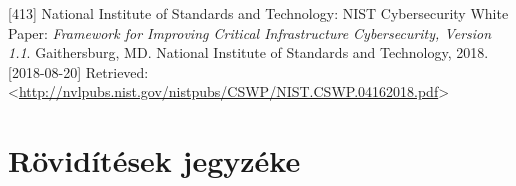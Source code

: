 \documentclass[12pt,magyar,a4paper,oneside]{scrreprt}
\begin{document}
\leavevmode\hypertarget{ref-national_institute_of_standards_and_technology_framework_2018}{}%
{[}413{]} National Institute of Standards and Technology: NIST
Cybersecurity White Paper: \emph{Framework for Improving Critical
Infrastructure Cybersecurity, Version 1.1}. Gaithersburg, MD. National
Institute of Standards and Technology, 2018. {[}2018-08-20{]} Retrieved:
\textless{}\url{http://nvlpubs.nist.gov/nistpubs/CSWP/NIST.CSWP.04162018.pdf}\textgreater{}

\newpage

\hypertarget{ruxf6viduxedtuxe9sek-jegyzuxe9ke}{%
\chapter*{Rövidítések jegyzéke}\label{ruxf6viduxedtuxe9sek-jegyzuxe9ke}}
\end{document}

